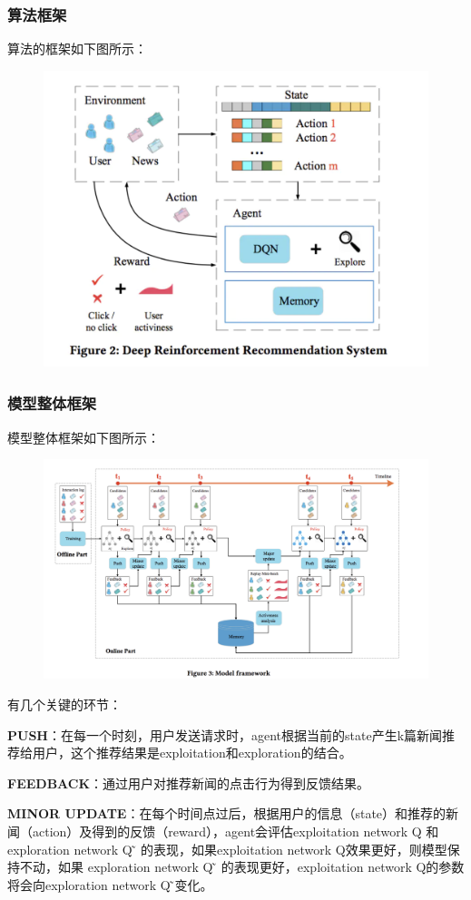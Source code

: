 \documentclass[12pt]{article}
\begin{document}
\subsubsection{算法框架}
算法的框架如下图所示：
\begin{figure}[H]
    \centering
    \includegraphics[width=.6\textwidth]{fig/DRN_Structure.png}
\end{figure}

\subsubsection{模型整体框架}
模型整体框架如下图所示：
\begin{figure}[H]
    \centering
    \includegraphics[width=1\textwidth]{fig/DRN_Structure_Detail.png}
\end{figure}

有几个关键的环节：

\textbf{PUSH}：在每一个时刻，用户发送请求时，agent根据当前的state产生k篇新闻推荐给用户，这个推荐结果是exploitation和exploration的结合。

\textbf{FEEDBACK}：通过用户对推荐新闻的点击行为得到反馈结果。

\textbf{MINOR UPDATE}：在每个时间点过后，根据用户的信息（state）和推荐的新闻（action）及得到的反馈（reward），agent会评估exploitation network Q 和 exploration network Q ̃ 的表现，如果exploitation network Q效果更好，则模型保持不动，如果 exploration network Q ̃ 的表现更好，exploitation network Q的参数将会向exploration network Q ̃变化。
\end{document}
